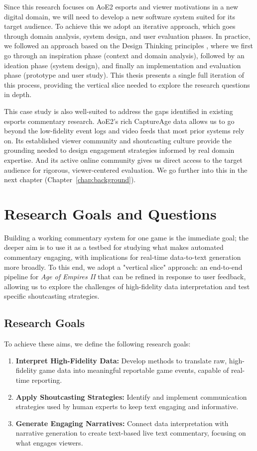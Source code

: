 Since this research focuses on AoE2 esports and viewer motivations in a new digital domain, we will need to develop a new software system suited for its target audience. To achieve this we adopt an iterative approach, which goes through domain analysis, system design, and user evaluation phases. In practice, we followed an approach based on the Design Thinking principles \cite{brown2008}, where we first go through an inspiration phase (context and domain analysis), followed by an ideation phase (system design), and finally an implementation and evaluation phase (prototype and user study). This thesis presents a single full iteration of this process, providing the vertical slice needed to explore the research questions in depth.

This case study is also well-suited to address the gaps identified in existing esports commentary research. AoE2's rich CaptureAge data allows us to go beyond the low-fidelity event logs and video feeds that most prior systems rely on. Its established viewer community and shoutcasting culture provide the grounding needed to design engagement strategies informed by real domain expertise. And its active online community gives us direct access to the target audience for rigorous, viewer-centered evaluation. We go further into this in the next chapter (Chapter~\ref{chap:background}).

\section{Research Goals and Questions}
Building a working commentary system for one game is the immediate goal; the deeper aim is to use it as a testbed for studying what makes automated commentary engaging, with implications for real-time data-to-text generation more broadly. To this end, we adopt a "vertical slice" approach: an end-to-end pipeline for \textit{Age of Empires II} that can be refined in response to user feedback, allowing us to explore the challenges of high-fidelity data interpretation and test specific shoutcasting strategies.
\subsection{Research Goals}
To achieve these aims, we define the following research goals:
\begin{enumerate}
  \item \textbf{Interpret High-Fidelity Data:} Develop methods to translate raw, high-fidelity game data into meaningful reportable game events, capable of real-time reporting.
  \item \textbf{Apply Shoutcasting Strategies:} Identify and implement communication strategies used by human experts to keep text engaging and informative.
  \item \textbf{Generate Engaging Narratives:} Connect data interpretation with narrative generation to create text-based live text commentary, focusing on what engages viewers.
\end{enumerate}

